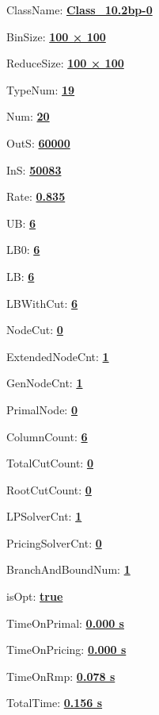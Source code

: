 \documentclass[11pt]{article}
\begin{document}
\pagestyle{empty}


ClassName: \underline{\textbf{Class_10.2bp-0}}
\par
BinSize: \underline{\textbf{100 × 100}}
\par
ReduceSize: \underline{\textbf{100 × 100}}
\par
TypeNum: \underline{\textbf{19}}
\par
Num: \underline{\textbf{20}}
\par
OutS: \underline{\textbf{60000}}
\par
InS: \underline{\textbf{50083}}
\par
Rate: \underline{\textbf{0.835}}
\par
UB: \underline{\textbf{6}}
\par
LB0: \underline{\textbf{6}}
\par
LB: \underline{\textbf{6}}
\par
LBWithCut: \underline{\textbf{6}}
\par
NodeCut: \underline{\textbf{0}}
\par
ExtendedNodeCnt: \underline{\textbf{1}}
\par
GenNodeCnt: \underline{\textbf{1}}
\par
PrimalNode: \underline{\textbf{0}}
\par
ColumnCount: \underline{\textbf{6}}
\par
TotalCutCount: \underline{\textbf{0}}
\par
RootCutCount: \underline{\textbf{0}}
\par
LPSolverCnt: \underline{\textbf{1}}
\par
PricingSolverCnt: \underline{\textbf{0}}
\par
BranchAndBoundNum: \underline{\textbf{1}}
\par
isOpt: \underline{\textbf{true}}
\par
TimeOnPrimal: \underline{\textbf{0.000 s}}
\par
TimeOnPricing: \underline{\textbf{0.000 s}}
\par
TimeOnRmp: \underline{\textbf{0.078 s}}
\par
TotalTime: \underline{\textbf{0.156 s}}
\par
\newpage


\end{document}
